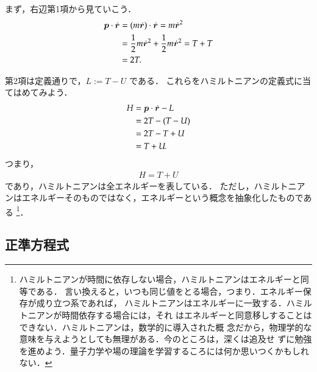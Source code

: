                 まず，右辺第1項から見ていこう．
                    \begin{align*}
                        \boldsymbol{p} \cdot \dot{\boldsymbol{r}} &= ( m \dot{\boldsymbol{r}} )\cdot \dot{\boldsymbol{r}} = m {\dot{\boldsymbol{r}}}^{2} \\
                                            &= \frac{1}{2}m {\dot{\boldsymbol{r}}}^{2} + \frac{1}{2}m {\dot{\boldsymbol{r}}}^{2} = T + T \\
                                            &= 2T.
                    \end{align*}

                第2項は定義通りで，$L := T - U$ である．
                これらをハミルトニアンの定義式に当てはめてみよう．
                    \begin{align*}
                        H &= \boldsymbol{p} \cdot \dot{\boldsymbol{r}} - L \\
                          &= 2T - (T - U)  \\
                          &= 2T - T + U  \\
                          &= T + U.
                    \end{align*}
                つまり，
                    \begin{align}
                        H = T + U
                    \end{align}
                であり，ハミルトニアンは全エネルギーを表している．
                ただし，ハミルトニアンはエネルギーそのものではなく，エネルギーという概念を抽象化したものである
                    \footnote{
                        ハミルトニアンが時間に依存しない場合，ハミルトニアンはエネルギーと同等である．
                        言い換えると，いつも同じ値をとる場合，つまり．エネルギー保存が成り立つ系であれば，
                        ハミルトニアンはエネルギーに一致する．ハミルトニアンが時間依存する場合には，それ
                        はエネルギーと同意移しすることはできない．ハミルトニアンは，数学的に導入された概
                        念だから，物理学的な意味を与えようとしても無理がある．今のところは，深くは追及せ
                        ずに勉強を進めよう．量子力学や場の理論を学習するころには何か思いつくかもしれない．
                    }．


        \subsection{正準方程式}
